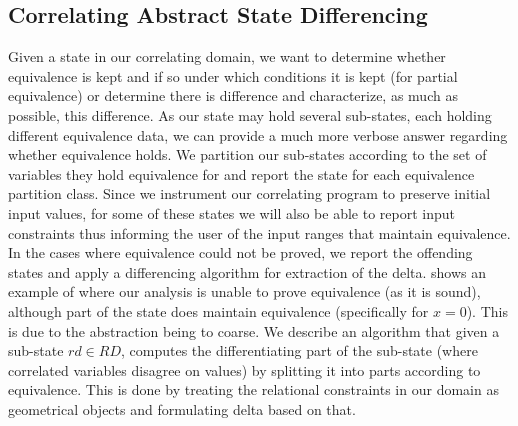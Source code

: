 \subsection{Correlating Abstract State Differencing} 
Given a state in our correlating domain, we want to determine whether equivalence is kept and if so under which conditions it is kept (for partial equivalence) or determine there is difference and characterize, as much as possible, this difference. As our state may hold several sub-states, each holding different equivalence data, we can provide a much more verbose answer regarding whether equivalence holds. We partition our sub-states according to the set of variables they hold equivalence for and report the state for each equivalence partition class. Since we instrument our correlating program to preserve initial input values, for some of these states we will also be able to report input constraints thus informing the user of the input ranges that maintain equivalence. In the cases where equivalence could not be proved, we report the offending states and apply a differencing algorithm for extraction of the delta.  shows an example of where our analysis is unable to prove equivalence (as it is sound), although part of the state does maintain equivalence (specifically for $x=0$). This is due to the abstraction being to coarse. We describe an algorithm that given a sub-state $rd \in RD$, computes the differentiating part of the sub-state (where correlated variables disagree on values) by splitting it into parts according to equivalence. This is done by treating the relational constraints in our domain as geometrical objects and formulating delta based on that.

